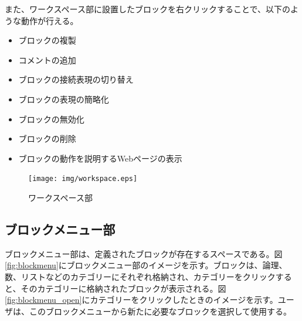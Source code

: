 \documentclass{risepaper}
\begin{document}
また、ワークスペース部に設置したブロックを右クリックすることで、以下のような動作が行える。

\begin{itemize}
\item ブロックの複製
\item コメントの追加
\item ブロックの接続表現の切り替え
\item ブロックの表現の簡略化
\item ブロックの無効化
\item ブロックの削除
\item ブロックの動作を説明するWebページの表示
\end{itemize} 
   
\begin{figure}[h]
\begin{center}
\texttt{[image: img/workspace.eps]}
\caption{ワークスペース部}%
\label{fig:workspace}
\end{center}%
\end{figure}%

   \subsection{ブロックメニュー部}
   
ブロックメニュー部は、定義されたブロックが存在するスペースである。図\ref{fig:blockmenu}にブロックメニュー部のイメージを示す。ブロックは、論理、数、リストなどのカテゴリーにそれぞれ格納され、カテゴリーをクリックすると、そのカテゴリーに格納されたブロックが表示される。図\ref{fig:blockmenu_open}にカテゴリーをクリックしたときのイメージを示す。ユーザは、このブロックメニューから新たに必要なブロックを選択して使用する。
\end{document}
